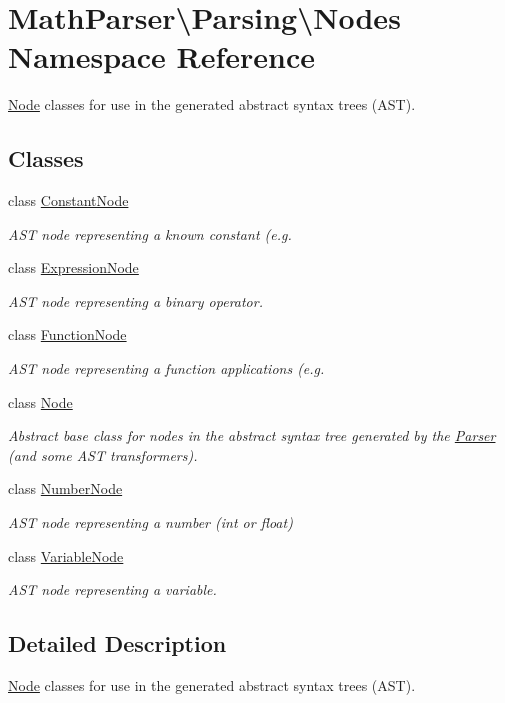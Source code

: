 \hypertarget{namespaceMathParser_1_1Parsing_1_1Nodes}{\section{Math\-Parser\textbackslash{}Parsing\textbackslash{}Nodes Namespace Reference}
\label{namespaceMathParser_1_1Parsing_1_1Nodes}
}


\hyperlink{classMathParser_1_1Parsing_1_1Nodes_1_1Node}{Node} classes for use in the generated abstract syntax trees (A\-S\-T).  


\subsection*{Classes}
\begin{DoxyCompactItemize}
\item 
class \hyperlink{classMathParser_1_1Parsing_1_1Nodes_1_1ConstantNode}{Constant\-Node}
\begin{DoxyCompactList}\small\item\em A\-S\-T node representing a known constant (e.\-g. \end{DoxyCompactList}\item 
class \hyperlink{classMathParser_1_1Parsing_1_1Nodes_1_1ExpressionNode}{Expression\-Node}
\begin{DoxyCompactList}\small\item\em A\-S\-T node representing a binary operator. \end{DoxyCompactList}\item 
class \hyperlink{classMathParser_1_1Parsing_1_1Nodes_1_1FunctionNode}{Function\-Node}
\begin{DoxyCompactList}\small\item\em A\-S\-T node representing a function applications (e.\-g. \end{DoxyCompactList}\item 
class \hyperlink{classMathParser_1_1Parsing_1_1Nodes_1_1Node}{Node}
\begin{DoxyCompactList}\small\item\em Abstract base class for nodes in the abstract syntax tree generated by the \hyperlink{classMathParser_1_1Parsing_1_1Parser}{Parser} (and some A\-S\-T transformers). \end{DoxyCompactList}\item 
class \hyperlink{classMathParser_1_1Parsing_1_1Nodes_1_1NumberNode}{Number\-Node}
\begin{DoxyCompactList}\small\item\em A\-S\-T node representing a number (int or float) \end{DoxyCompactList}\item 
class \hyperlink{classMathParser_1_1Parsing_1_1Nodes_1_1VariableNode}{Variable\-Node}
\begin{DoxyCompactList}\small\item\em A\-S\-T node representing a variable. \end{DoxyCompactList}\end{DoxyCompactItemize}


\subsection{Detailed Description}
\hyperlink{classMathParser_1_1Parsing_1_1Nodes_1_1Node}{Node} classes for use in the generated abstract syntax trees (A\-S\-T). 